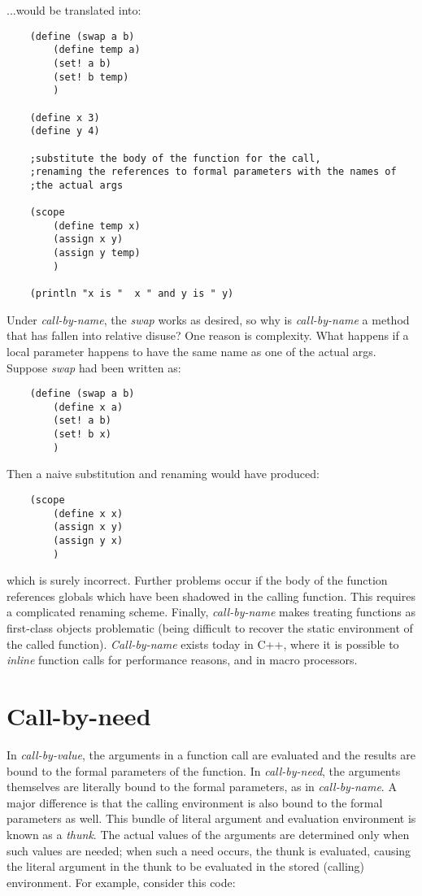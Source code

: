...would be translated into:

\begin{verbatim}
    (define (swap a b)
        (define temp a)
        (set! a b)
        (set! b temp)
        )

    (define x 3)
    (define y 4)

    ;substitute the body of the function for the call, 
    ;renaming the references to formal parameters with the names of 
    ;the actual args

    (scope
        (define temp x)
        (assign x y)
        (assign y temp)
        )

    (println "x is "  x " and y is " y)
\end{verbatim}

Under {\it call-by-name}, the {\it swap} works as desired,
so why is {\it call-by-name}
a method that has fallen into relative disuse? One reason is complexity.
What happens if a local parameter happens to have the same name as one of
the actual args. Suppose {\it swap} had been written as:

\begin{verbatim}
    (define (swap a b)
        (define x a) 
        (set! a b)
        (set! b x)
        )
\end{verbatim}

Then a naive substitution and renaming would have produced:

\begin{verbatim}
    (scope
        (define x x)
        (assign x y)
        (assign y x)
        )
\end{verbatim}

which is surely incorrect.
Further problems occur if the body of the function references
globals which have been shadowed in the calling function. This requires
a complicated renaming scheme. Finally, {\it call-by-name} makes treating
functions as first-class objects problematic (being difficult to recover
the static environment of the called function). {\it Call-by-name}
exists today in C++, where it is possible to {\it inline} function calls
for performance reasons, and in macro processors.

\section*{Call-by-need}

In {\it call-by-value}, the arguments in a function call are evaluated and
the results are bound to the formal parameters of the function. In
{\it call-by-need}, the arguments themselves are literally bound
to the formal
parameters, as in {\it call-by-name}. A major difference is
that the calling environment is also bound to the formal
parameters as well. This bundle of literal argument and 
evaluation environment is known as a {\it thunk}.
The actual values of the arguments
are determined only when such values are
needed; when such a need occurs, the thunk is
evaluated, causing the literal argument
in the thunk to be
evaluated in the stored (calling) environment.
For example, consider this code:

